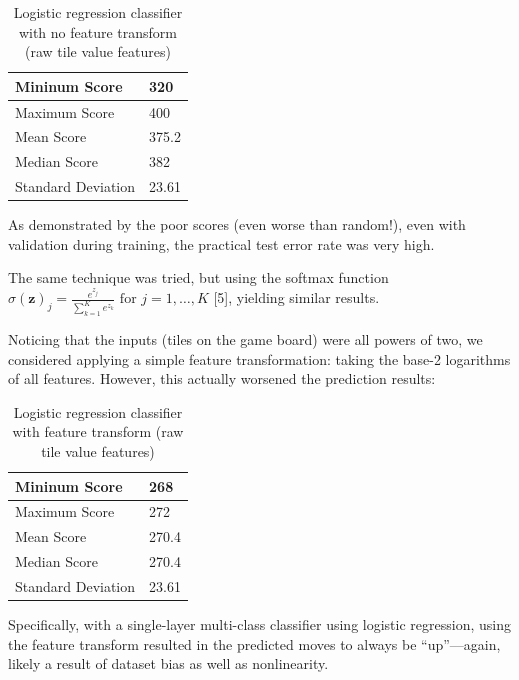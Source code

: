 \documentclass[9pt,twocolumn]{article}
\begin{document}
\begin{table}[!htbp]

\centering

\begin{tabular}{|l|l|}
\hline
Mininum Score      & 320 \\ \hline
Maximum Score      & 400 \\ \hline
Mean Score         & 375.2 \\ \hline
Median Score       & 382 \\ \hline
Standard Deviation & 23.61 \\ \hline
\end{tabular}

\caption{Logistic regression classifier with no feature transform (raw tile value features)}

\end{table}

As demonstrated by the poor scores (even worse than random!), even with validation during training, the practical test error rate was very high.

The same technique was tried, but using the softmax function $\sigma(\mathbf{z})_j = \frac{e^{z_j}}{\sum_{k=1}^K e^{z_k}} \text{ for } j = 1, \dots, K$ [5], yielding similar results.

Noticing that the inputs (tiles on the game board) were all powers of two, we considered applying a simple feature transformation: taking the base-2 logarithms of all features. However, this actually worsened the prediction results:

\begin{table}[!htbp]

\centering

\begin{tabular}{|l|l|}
\hline
Mininum Score      & 268 \\ \hline
Maximum Score      & 272 \\ \hline
Mean Score         & 270.4 \\ \hline
Median Score       & 270.4 \\ \hline
Standard Deviation & 23.61 \\ \hline
\end{tabular}

\caption{Logistic regression classifier with feature transform (raw tile value features)}

\end{table}

Specifically, with a single-layer multi-class classifier using logistic regression, using the feature transform resulted in the predicted moves to always be “up”---again, likely a result of dataset bias as well as nonlinearity.
\end{document}
